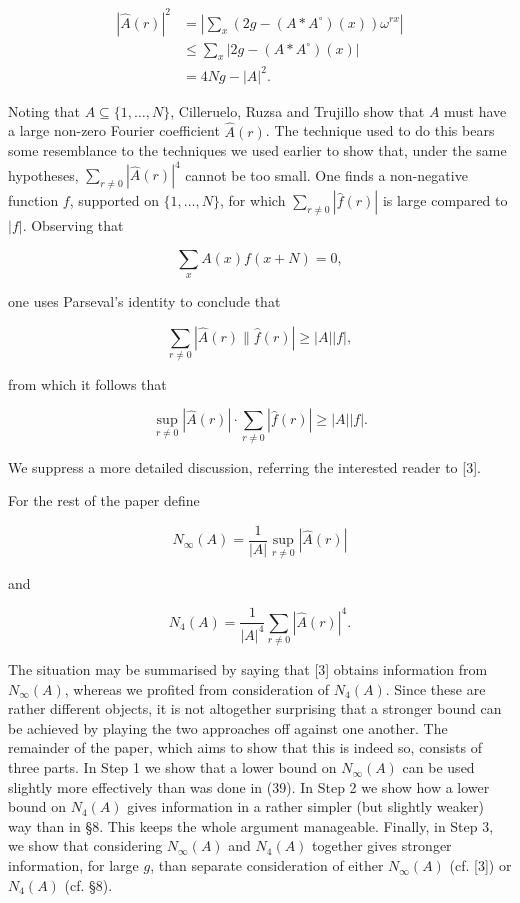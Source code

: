 \documentclass[10pt]{article}
\begin{document}
\begin{align*}
|\hat{A}(r)|^{2} & =\left|\sum_{x}\left(2 g-\left(A * A^{\circ}\right)(x)\right) \omega^{r x}\right| \\
& \leq \sum_{x}\left|2 g-\left(A * A^{\circ}\right)(x)\right| \\
& =4 N g-|A|^{2} . \tag{39}
\end{align*}


Noting that $A \subseteq\{1, \ldots, N\}$, Cilleruelo, Ruzsa and Trujillo show that $A$ must have a large non-zero Fourier coefficient $\hat{A}(r)$. The technique used to do this bears some resemblance to the techniques we used earlier to show that, under the same hypotheses, $\sum_{r \neq 0}|\hat{A}(r)|^{4}$ cannot be too small. One finds a non-negative function $f$, supported on $\{1, \ldots, N\}$, for which $\sum_{r \neq 0}|\hat{f}(r)|$ is large compared to $|f|$. Observing that

$$
\sum_{x} A(x) f(x+N)=0,
$$

one uses Parseval's identity to conclude that

$$
\sum_{r \neq 0}|\hat{A}(r) \| \hat{f}(r)| \geq|A||f|,
$$

from which it follows that

$$
\sup _{r \neq 0}|\hat{A}(r)| \cdot \sum_{r \neq 0}|\hat{f}(r)| \geq|A||f| .
$$

We suppress a more detailed discussion, referring the interested reader to [3].

For the rest of the paper define

$$
N_{\infty}(A)=\frac{1}{|A|} \sup _{r \neq 0}|\hat{A}(r)|
$$

and

$$
N_{4}(A)=\frac{1}{|A|^{4}} \sum_{r \neq 0}|\hat{A}(r)|^{4} .
$$

The situation may be summarised by saying that [3] obtains information from $N_{\infty}(A)$, whereas we profited from consideration of $N_{4}(A)$. Since these are rather different objects, it is not altogether surprising that a stronger bound can be achieved by playing the two approaches off against one another. The remainder of the paper, which aims to show that this is indeed so, consists of three parts. In Step 1 we show that a lower bound on $N_{\infty}(A)$ can be used slightly more effectively than was done in (39). In Step 2 we show how a lower bound on $N_{4}(A)$ gives information in a rather simpler (but slightly weaker) way than in §8. This keeps the whole argument manageable. Finally, in Step 3, we show that considering $N_{\infty}(A)$ and $N_{4}(A)$ together gives stronger information, for large $g$, than separate consideration of either $N_{\infty}(A)$ (cf. [3]) or $N_{4}(A)$ (cf. §8).
\end{document}
